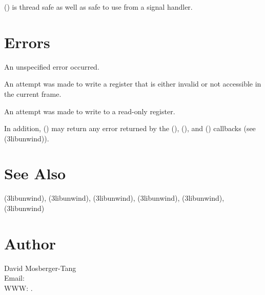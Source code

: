 \documentclass{article}
\begin{document}
() is thread safe as well as safe to use
from a signal handler.

\section{Errors}

\begin{Description}
\item[\Const{UNW\_EUNSPEC}] An unspecified error occurred.
\item[\Const{UNW\_EBADREG}] An attempt was made to write a register
  that is either invalid or not accessible in the current frame.
\item[\Const{UNW\_EREADONLY}] An attempt was made to write to a
  read-only register.
\end{Description}
In addition, () may return any error returned by
the (), (), and
() callbacks (see
(3libunwind)).

\section{See Also}

(3libunwind),
(3libunwind),
(3libunwind),
(3libunwind),
(3libunwind),
(3libunwind)

\section{Author}

\noindent
David Mosberger-Tang\\
Email: \\
WWW: .
\LatexManEnd
\end{document}
